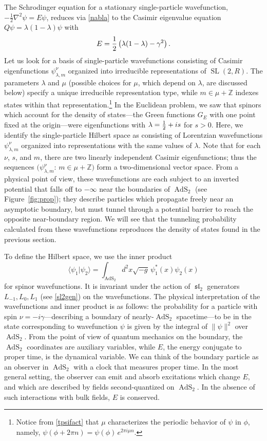 \documentclass[12pt]{article}
\newcommand{\be}{\begin{equation}}
\newcommand{\ee}{\end{equation}}
\newcommand{\lt}{\left}
\newcommand{\rt}{\right}
\newcommand{\blangle}{\bigl\langle}
\newcommand{\brangle}{\bigr\rangle}
\newcommand*{\bbraket}[2]{\blangle{#1}\big|{#2}\brangle}
\newcommand{\ZZ}{\mathbb{Z}}
\newcommand{\RR}{\mathbb{R}}
\DeclareMathOperator{\sL}{\mathfrak{sl}}
\DeclareMathOperator{\tSL}{\widetilde{\mathrm{SL}}}
\DeclareMathOperator{\tAdS}{\widetilde{AdS}}
\newcommand{\lam}{\lambda}
\newcommand{\ga}{\gamma}
\newcommand{\ov}{\over}
\def\widetilde#1{#1}%
\def\RR{R}
\begin{document}
The Schrodinger equation for a stationary single-particle wavefunction, $-\frac{1}{2}\nabla^2\psi=E\psi$, reduces via \eqref{nabla} to the Casimir eigenvalue equation $Q\psi=\lam(1-\lam)\psi$ with
\be \label{EQrel}
E={1 \ov 2}\lt(\lam(1-\lam)-\ga^2\rt).
\ee
Let us look for a basis of single-particle wavefunctions consisting of Casimir eigenfunctions $\psi^{\nu}_{\lam, m}$ organized into irreducible representations of $\tSL(2,\RR)$. The parameters $\lambda$ and $\mu$ (possible choices for $\mu$, which depend on $\lam$, are discussed below) specify a unique irreducible representation type, while $m \in \mu+\ZZ$ indexes states within that representation.\footnote{Notice from \eqref{tpsifact} that $\mu$ characterizes the periodic behavior of $\psi$ in $\phi$, namely, $\psi(\phi+2\pi n)=\psi(\phi)\,e^{2\pi i\mu n}$.} In the Euclidean problem, we saw that spinors which account for the density of states---the Green functions $G_E$ with one point fixed at the origin---were eigenfunctions with $\lambda={1 \ov 2}+is$ for $s>0$. Here, we identify the single-particle Hilbert space as consisting of Lorentzian wavefunctions $\psi^{\nu}_{\lam, m}$ organized into representations with the same values of $\lam$. Note that for each $\nu$, $s$, and $m$, there are two linearly independent Casimir eigenfunctions; thus the sequences $\bigl(\psi^{\nu}_{\lam,m}:\, m\in\mu+\ZZ\bigr)$ form a two-dimensional vector space. From a physical point of view, these wavefunctions are each subject to an inverted potential that falls off to $-\infty$ near the boundaries of $\tAdS_2$ (see Figure~\ref{fig:prop}); they describe particles which propagate freely near an asymptotic boundary, but must tunnel through a potential barrier to reach the opposite near-boundary region. We will see that the tunneling probability calculated from these wavefunctions reproduces the density of states found in the previous section.

To define the Hilbert space, we use the inner product 
\begin{equation} \label{innprod}
\bbraket{\psi_1} {\psi_2}=\int_{\tAdS_2} d^2 x \sqrt{-g}\,\psi_1^*(x) \psi_2(x)
\end{equation}
for spinor wavefunctions. It is invariant under the action of $\sL_2$ generators $L_{-1}, L_{0}, L_{1}$ (see \eqref{sl2gen}) on the wavefunctions. The physical interpretation of the wavefunctions and inner product is as follows: the probability for a particle with spin $\nu=-i \ga$---describing a boundary of nearly-$\tAdS_2$ spacetime---to be in the state corresponding to wavefunction $\psi$ is given by the integral of $\|\psi\|^2$ over $\tAdS_2$. From the point of view of quantum mechanics on the boundary, the $\tAdS_2$ coordinates are auxiliary variables, while $E$, the energy conjugate to proper time, is the dynamical variable. We can think of the boundary particle as an observer in $\tAdS_2$ with a clock that measures proper time. In the most general setting, the observer can emit and absorb excitations which change $E$, and which are described by fields second-quantized on $\tAdS_2$. In the absence of such interactions with bulk fields, $E$ is conserved.
\end{document}
